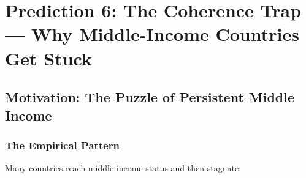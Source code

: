 \section{Prediction 6: The Coherence Trap --- Why Middle-Income Countries Get Stuck}
\label{app:prediction-coherence-trap}


\begin{abstract}
This appendix provides the complete technical foundation for Prediction 6 of the 
Complementarity-Context Framework: that middle-income countries can become trapped 
in coherent but suboptimal equilibria, where the very coherence of their current 
configuration prevents transition to higher-income status. We develop the formal 
model of coherence traps, derive the conditions for escape (simultaneous reform 
across multiple dimensions), validate against historical development trajectories, 
and explain why Korea escaped while Brazil remained stuck. The analysis reframes 
the ``middle-income trap'' as a coherence problem, not merely an institutional or 
human capital problem.
\end{abstract}

\subsection{Motivation: The Puzzle of Persistent Middle Income}

\subsubsection{The Empirical Pattern}

Many countries reach middle-income status and then stagnate:

